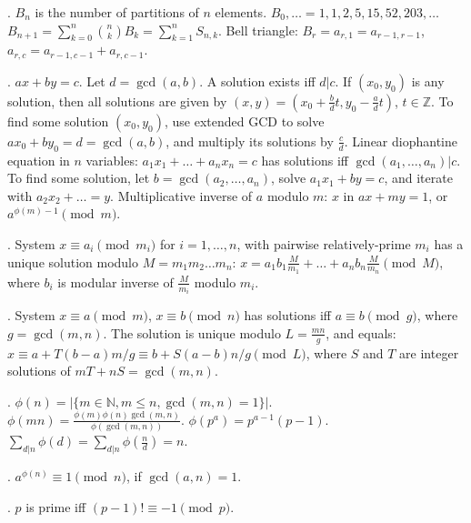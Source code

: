  
.
$B_n$ is the number of partitions of $n$ elements.
$B_0, \ldots = 1,1,2,5,15,52,203,\ldots$ \\
$B_{n+1} = \sum_{k=0}^n {n \choose k} B_k = \sum_{k=1}^n S_{n,k}$.
Bell triangle: $B_r=a_{r,1}=a_{r-1,r-1}$, $a_{r,c}=a_{r-1,c-1}+a_{r,c-1}$.
 
 
. $ax+by=c$.
Let $d=\gcd(a,b)$. A solution exists iff $d|c$.
If $(x_0,y_0)$ is any solution, then all solutions are given by
$(x,y) = (x_0 + \frac{b}{d}t, y_0 - \frac{a}{d}t)$, $t \in {\mathbb Z}$.
To find some solution $(x_0, y_0)$, use extended GCD to solve
$ax_0 + by_0 = d = \gcd(a, b)$, and multiply its solutions by $\frac{c}{d}$.
Linear diophantine equation in $n$ variables:
$a_1 x_1 + \dots + a_n x_n = c$ has solutions iff $\gcd(a_1, \dots, a_n) | c$.
To find some solution, let $b=\gcd(a_2, \dots, a_n)$,
solve $a_1 x_1 + by = c$, and iterate with $a_2 x_2 + \dots = y$.
Multiplicative inverse of $a$ modulo $m$:
$x$ in $ax + my = 1$, or $a^{\phi(m)-1} \pmod{m}$.
 
.
System $x \equiv a_i \pmod{m_i}$ for $i=1,\dots,n$, with
pairwise relatively-prime $m_i$ has a unique solution modulo $M = m_1 m_2 \dots m_n$:
$x = a_1 b_1 \frac{M}{m_1} + \dots + a_n b_n \frac{M}{m_n} \pmod{M}$,
where $b_i$ is modular inverse of $\frac{M}{m_i}$ modulo $m_i$.
 
.
System $x \equiv a \pmod{m}$, $x \equiv b \pmod{n}$ has solutions
iff $a \equiv b \pmod{g}$, where $g=\gcd(m,n)$.
The solution is unique modulo $L=\frac{mn}{g}$, and equals:
$x \equiv a + T(b-a) m/g \equiv b + S(a-b) n/g \pmod{L}$,
where $S$ and $T$ are integer solutions of $mT + nS = \gcd(m,n)$.
 
.
$\phi(n)=|\{m \in {\mathbb N}, m \le n, \gcd(m, n) = 1 \}|$. \\
$\phi(mn) = \frac{\phi(m) \phi(n) \gcd(m,n)}{\phi(\gcd(m,n))}$. \quad
$\phi(p^a) = p^{a-1} (p-1)$. \quad
$\sum_{d|n} \phi(d) = \sum_{d|n} \phi(\frac{n}{d}) = n$.
 
. $a^{\phi(n)} \equiv 1\pmod{n}$, if $\gcd(a,n)=1$.
 
. $p$ is prime iff $(p - 1)! \equiv -1 \pmod p$.
 
